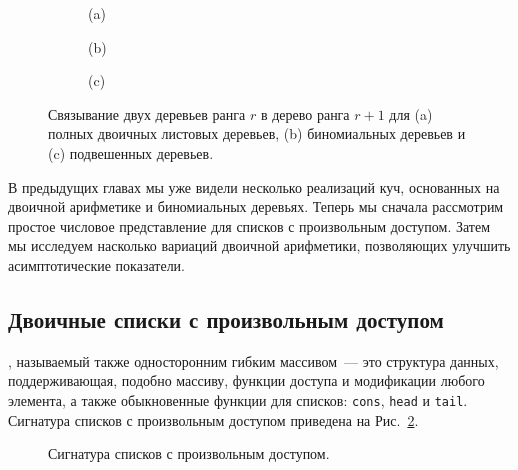 \begin{figure}
  \centering
  \begin{subfigure}[b]{0.45\textwidth}
    \centering
    \par\vspace{0.2cm}
    (a)
  \end{subfigure}
  \begin{subfigure}[b]{0.45\textwidth}
    \centering
    \par\vspace{0.2cm}
    (b)
  \end{subfigure}\par\vspace{0.2cm}
  \begin{subfigure}[b]{1\textwidth}
    \centering
    \par\vspace{0.2cm}
    (c)
  \end{subfigure}
  
  \caption{Связывание двух деревьев ранга $r$ в дерево ранга $r+1$ для
    (a) полных двоичных листовых деревьев, (b) биномиальных деревьев и
    (c) подвешенных деревьев.}
  \label{fig:9.3}
\end{figure}

В предыдущих главах мы уже видели несколько реализаций куч,
основанных на двоичной арифметике и биномиальных деревьях. Теперь мы
сначала рассмотрим простое числовое представление для списков с
произвольным доступом. Затем мы исследуем насколько вариаций двоичной
арифметики, позволяющих улучшить асимптотические показатели.

\subsection{Двоичные списки с произвольным доступом}
\label{sc:9.2.1}

, называемый
также односторонним гибким массивом~--- это структура данных,
поддерживающая, подобно массиву, функции доступа и модификации любого
элемента, а также обыкновенные функции для списков: \lstinline!cons!,
\lstinline!head! и \lstinline!tail!. Сигнатура списков с произвольным
доступом приведена на Рис.~\ref{fig:9.4}.

\begin{figure}
  \centering
  
  \caption{Сигнатура списков с произвольным доступом.}
  \label{fig:9.4}
\end{figure}

